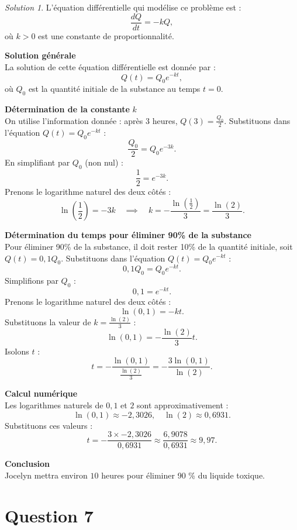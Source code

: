 \documentclass[
  12pt,
  letterpaper,
]{book}
\theoremstyle{remark}
\newtheorem*{solution}{Solution}
\begin{document}
\begin{solution}

L'équation différentielle qui modélise ce problème est : \[
\frac{dQ}{dt} = -kQ,
\] où \(k > 0\) est une constante de proportionnalité.

\textbf{Solution générale}\\
La solution de cette équation différentielle est donnée par : \[
Q(t) = Q_0 e^{-kt},
\] où \(Q_0\) est la quantité initiale de la substance au temps
\(t = 0\).

\textbf{Détermination de la constante} \(k\)\\
On utilise l'information donnée : après 3 heures,
\(Q(3) = \frac{Q_0}{2}\). Substituons dans l'équation
\(Q(t) = Q_0 e^{-kt}\) : \[
\frac{Q_0}{2} = Q_0 e^{-3k}.
\] En simplifiant par \(Q_0\) (non nul) : \[
\frac{1}{2} = e^{-3k}.
\] Prenons le logarithme naturel des deux côtés : \[
\ln\left(\frac{1}{2}\right) = -3k \quad \implies \quad k = -\frac{\ln\left(\frac{1}{2}\right)}{3} = \frac{\ln(2)}{3}.
\]

\textbf{Détermination du temps pour éliminer 90\% de la substance}\\
Pour éliminer 90\% de la substance, il doit rester 10\% de la quantité
initiale, soit \(Q(t) = 0{,}1Q_0\). Substituons dans l'équation
\(Q(t) = Q_0 e^{-kt}\) : \[
0{,}1Q_0 = Q_0 e^{-kt}.
\] Simplifions par \(Q_0\) : \[
0{,}1 = e^{-kt}.
\] Prenons le logarithme naturel des deux côtés : \[
\ln(0{,}1) = -kt.
\] Substituons la valeur de \(k = \frac{\ln(2)}{3}\) : \[
\ln(0{,}1) = -\frac{\ln(2)}{3} t.
\] Isolons \(t\) : \[
t = -\frac{\ln(0{,}1)}{\frac{\ln(2)}{3}} = -\frac{3 \ln(0{,}1)}{\ln(2)}.
\]

\textbf{Calcul numérique}\\
Les logarithmes naturels de \(0{,}1\) et \(2\) sont approximativement :
\[
\ln(0{,}1) \approx -2{,}3026, \quad \ln(2) \approx 0{,}6931.
\] Substituons ces valeurs : \[
t = -\frac{3 \times -2{,}3026}{0{,}6931} \approx \frac{6{,}9078}{0{,}6931} \approx 9{,}97.
\]

\textbf{Conclusion}\\
Jocelyn mettra environ \(10\) heures pour éliminer 90 \% du liquide
toxique.

\end{solution}

\hypertarget{question-7-2}{%
\section{Question 7}\label{question-7-2}}
\end{document}
